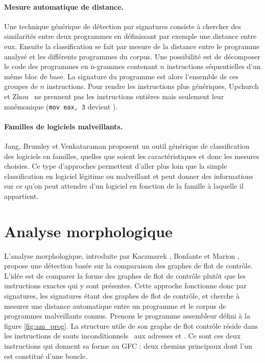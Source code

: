 \paragraph{Mesure automatique de distance.}
Une technique générique de détection par signatures consiste à chercher des similarités entre deux programmes en définissant par exemple une distance entre eux. 
Ensuite la classification se fait par mesure de la distance entre le programme analysé et les différents programmes du corpus.
Une possibilité est de décomposer le code des programmes en n-grammes contenant $n$ instructions séquentielles d'un même bloc de base. La signature du programme est alors l'ensemble de ces groupes de $n$ instructions. Pour rendre les instructions plus génériques, Upchurch et Zhou~\cite{UZ13} ne prennent pas les instructions entières mais seulement leur mnémonique (\texttt{mov eax, 3} devient \mov).

\paragraph{Familles de logiciels malveillants.}
Jang, Brumley et Venkataraman \cite{JBV11} proposent un outil générique de classification des logiciels en familles, quelles que soient les caractéristiques et donc les mesures choisies. Ce type d'approches permettent d'aller plus loin que la simple classification en logiciel légitime ou malveillant et peut donner des informations sur ce qu'on peut attendre d'un logiciel en fonction de la famille à laquelle il appartient.

\section{Analyse morphologique}
L'analyse morphologique, introduite par Kaczmarek \cite{Kacz08}, Bonfante et Marion \cite{BKM08}, propose une détection 
basée sur la comparaison des graphes de flot de contrôle. L'idée est de comparer la forme des graphes de flot de contrôle plutôt que les instructions exactes qui y sont présentes.
Cette approche fonctionne donc par signatures, les signatures étant des graphes de flot de contrôle, et cherche à mesurer une distance automatique entre un programme et le corpus de programmes malveillants connus.
Prenons le programme assembleur défini à la figure \ref{fig:am_prog}. La structure utile de son graphe de flot contrôle réside dans les instructions de sauts inconditionnels \jne\ aux adresses  et . Ce sont ces deux instructions qui donnent sa forme au GFC : deux chemins principaux dont l'un est constitué d'une boucle.

